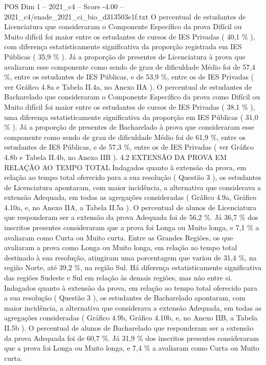 \begin{textsample}{POS Dim 1 – 2021\_c4 – Score -4.00 – 2021\_c4/enade\_2021\_ci\_bio\_d313503e1f.txt}
O percentual de estudantes de Licenciatura que consideraram o Componente Específico da prova Difícil ou Muito difícil foi maior entre os estudantes de cursos de IES Privadas ( 40,1 \% ), com diferença estatisticamente significativa da proporção registrada em IES Públicas ( 35,9 \% ).
Já a proporção de presentes de Licenciatura à prova que avaliaram esse componente como sendo de grau de dificuldade Médio foi de 57,4 \%, entre os estudantes de IES Públicas, e de 53,9 \%, entre os de IES Privadas ( ver Gráfico 4.8a e Tabela II.4a, no Anexo IIA ).
O percentual de estudantes de Bacharelado que consideraram o Componente Específico da prova como Difícil ou Muito difícil foi maior entre os estudantes de cursos de IES Privadas ( 38,1 \% ), uma diferença estatisticamente significativa da proporção em IES Públicas ( 31,0 \% ).
Já a proporção de presentes de Bacharelado à prova que consideraram esse componente como sendo de grau de dificuldade Médio foi de 61,9 \%, entre os estudantes de IES Públicas, e de 57,3 \%, entre os de IES Privadas ( ver Gráfico 4.8b e Tabela II.4b, no Anexo IIB ). 4.2 EXTENSÃO DA PROVA EM RELAÇÃO AO TEMPO TOTAL Indagados quanto à extensão da prova, em relação ao tempo total oferecido para a sua resolução ( Questão 3 ), os estudantes de Licenciatura apontaram, com maior incidência, a alternativa que considerava a extensão Adequada, em todas as agregações consideradas ( Gráfico 4.9a, Gráfico 4.10a, e, no Anexo IIA, a Tabela II.5a ).
O percentual de alunos de Licenciatura que responderam ser a extensão da prova Adequada foi de 56,2 \%.
Já 36,7 \% dos inscritos presentes consideraram que a prova foi Longa ou Muito longa, e 7,1 \% a avaliaram como Curta ou Muito curta.
Entre as Grandes Regiões, os que avaliaram a prova como Longa ou Muito longa, em relação ao tempo total destinado à sua resolução, atingiram uma porcentagem que variou de 31,4 \%, na região Norte, até 39,2 \%, na região Sul.
Há diferença estatisticamente significativa das regiões Sudeste e Sul em relação às demais regiões, mas não entre si.
Indagados quanto à extensão da prova, em relação ao tempo total oferecido para a sua resolução ( Questão 3 ), os estudantes de Bacharelado apontaram, com maior incidência, a alternativa que considerava a extensão Adequada, em todas as agregações consideradas ( Gráfico 4.9b, Gráfico 4.10b, e, no Anexo IIB, a Tabela II.5b ).
O percentual de alunos de Bacharelado que responderam ser a extensão da prova Adequada foi de 60,7 \%.
Já 31,9 \% dos inscritos presentes consideraram que a prova foi Longa ou Muito longa, e 7,4 \% a avaliaram como Curta ou Muito curta.

\end{textsample}
